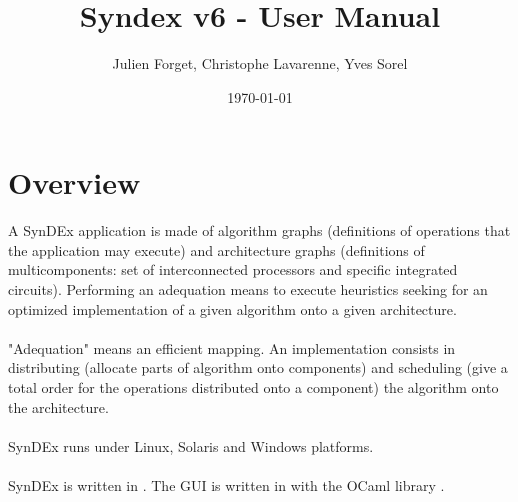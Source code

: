 \documentclass[11pt,twoside]{report}
\begin{document}
\title{Syndex v6 - User Manual}
\author{Julien Forget, Christophe Lavarenne, Yves Sorel}
\date{\today}
\maketitle
\tableofcontents

\chapter{Overview}
A SynDEx application is made of algorithm graphs (definitions of
operations that the application may execute) and architecture graphs
(definitions of multicomponents: set of interconnected processors and
specific integrated circuits). Performing an adequation means to
execute heuristics seeking for an optimized implementation of a given
algorithm onto a given architecture.\\\\
"Adequation" means an efficient mapping. An implementation consists in
distributing (allocate parts of algorithm onto components) and
scheduling (give a total order for the operations
distributed onto a component) the algorithm onto the architecture.\\\\
SynDEx runs under Linux, Solaris and Windows platforms.\\\\
SynDEx is written in . The GUI is written in
 with the
OCaml library .
\end{document}

